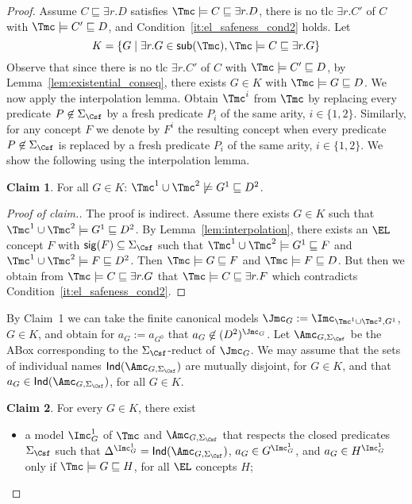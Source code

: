 \documentclass{lmcs}
\theoremstyle{definition}
\newtheorem{claim}{Claim}
\let\OriginalQedSymbol\qedsymbol
\renewcommand{\qedsymbol}{\OriginalQedSymbol\setcounter{claim}{0}}
\let\NormalQedSymbol\qedsymbol
\newenvironment{clmproof}[1]{\renewcommand{\qedsymbol}{$\dashv$}\begin{proof}[Proof of claim.]\space#1}{\end{proof}\renewcommand{\qedsymbol}{\NormalQedSymbol}}
\begin{document}
\begin{proof}
  Assume $C \sqsubseteq \exists r.D$ satisfies $\Tmc\models C \sqsubseteq \exists r.D$,
  there is no tlc $\exists r.C'$ of $C$ with $\Tmc\models C' \sqsubseteq D$, and 
  Condition~\ref{it:el_safeness_cond2} holds. 
  Let  
$$
K= \{ G \mid \exists r.G \in {\sf sub}(\Tmc), \Tmc \models C
\sqsubseteq \exists r.G\}
$$ 
Observe that since there is no tlc $\exists r . C'$ of $C$ with $\Tmc\models C'
\sqsubseteq D$, by Lemma~\ref{lem:existential_conseq}, there exists
$G\in K$ with $\Tmc\models G \sqsubseteq D$. We now apply the interpolation lemma.
Obtain $\Tmc^{i}$ from $\Tmc$ by replacing every predicate $P\not\in\Sigma_{\Csf}$ by a 
fresh predicate $P_{i}$ of the same arity, $i\in \{1,2\}$. Similarly, for any \EL concept
$F$ we denote by $F^{i}$ the resulting concept when every predicate $P\not\in\Sigma_{\Csf}$ is
replaced by a fresh predicate $P_{i}$ of the same arity, $i\in \{1,2\}$. We show the following
using the interpolation lemma.
\begin{claim}
  For all $G\in K$: $\Tmc^{1}\cup \Tmc^{2}\not\models
  G^{1}\sqsubseteq D^{2}$.
\end{claim}
\begin{clmproof}
The proof is indirect. Assume there exists $G\in K$ such that $\Tmc^{1}\cup
\Tmc^{2}\models G^{1}\sqsubseteq D^{2}$.  By Lemma~\ref{lem:interpolation}, there exists an $\EL$ concept
$F$ with ${\sf sig}(F)\subseteq \Sigma_{\Csf}$
such that $\Tmc^{1}\cup \Tmc^{2}\models G^{1}\sqsubseteq F$ and
$\Tmc^{1}\cup \Tmc^{2}\models F\sqsubseteq D^{2}$. Then $\Tmc\models G
\sqsubseteq F$ and $\Tmc\models F \sqsubseteq D$. But then we obtain 
from $\Tmc\models C \sqsubseteq \exists r.G$ that $\Tmc\models C \sqsubseteq \exists
r.F$ which contradicts Condition~\ref{it:el_safeness_cond2}.
\end{clmproof}

By Claim~1 we can take the finite canonical models
$\Jmc_{G}:=\Imc_{\Tmc^{1}\cup \Tmc^{2},G^{1}}$, $G\in K$, and
obtain for $a_{G}:=a_{G^{0}}$ that $a_{G}\not\in (D^{2})^{\Jmc_{G}}$.
Let $\Amc_{G,\Sigma_\Csf}$ be the ABox corresponding to the $\Sigma_\Csf$-reduct 
of $\Jmc_{G}$. We may assume that the sets of individual names ${\sf Ind}(\Amc_{G,\Sigma_\Csf})$ are
mutually disjoint, for $G\in K$, and that $a_{G}\in {\sf Ind}(\Amc_{G,\Sigma_\Csf})$, for all $G\in K$.

\begin{claim} For every $G\in K$, there exist
\begin{itemize}
\item a model $\Imc_{G}^{1}$ of $\Tmc$ and $\Amc_{G,\Sigma_\Csf}$ that respects the closed predicates $\Sigma_{\Csf}$
such that $\Delta^{\Imc_{G}^{1}}={\sf Ind}(\Amc_{G,\Sigma_\Csf})$, $a_{G}\in G^{\Imc_{G}^{1}}$,
and $a_{G}\in H^{\Imc_{G}^{1}}$ only if $\Tmc\models G\sqsubseteq H$, for all 
$\EL$ concepts $H$;


\end{itemize}
\end{claim}
\end{proof}
\end{document}
